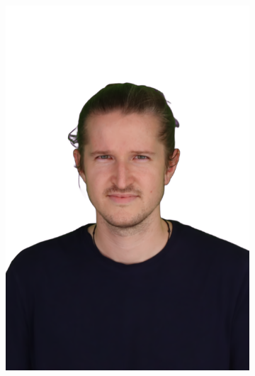 \begin{figure}
\begin{subfigure}{0.18\linewidth}
        \includegraphics[width=\textwidth]{Figures/results/splatfacto_ex/2_render.png}

\end{subfigure}
\end{figure}
